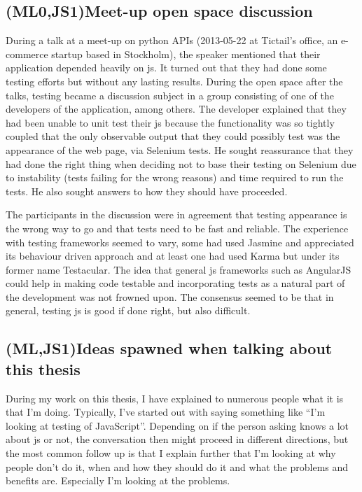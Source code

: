\documentclass[11pt]{article}
\begin{document}
\subsection{(ML0,JS1)Meet-up open space discussion}
\label{subsec:openspace}

During a talk at a meet-up on python APIs (2013-05-22 at Tictail's office, an e-commerce startup based in Stockholm), the speaker mentioned that their application depended heavily on \gls{js}. It turned out that they had done some testing efforts but without any lasting results. During the open space after the talks, testing became a discussion subject in a group consisting of one of the developers of the application, among others. The developer explained that they had been unable to unit test their \gls{js} because the functionality was so tightly coupled that the only observable output that they could possibly test was the appearance of the web page, via Selenium tests. He sought reassurance that they had done the right thing when deciding not to base their testing on Selenium due to instability (tests failing for the wrong reasons) and time required to run the tests. He also sought answers to how they should have proceeded.

The participants in the discussion were in agreement that testing appearance is the wrong way to go and that tests need to be fast and reliable. The experience with testing frameworks seemed to vary, some had used Jasmine and appreciated its behaviour driven approach and at least one had used Karma but under its former name Testacular. The idea that general \gls{js} frameworks such as AngularJS could help in making code testable and incorporating tests as a natural part of the development was not frowned upon. The consensus seemed to be that in general, testing \gls{js} is good if done right, but also difficult.

\subsection{(ML,JS1)Ideas spawned when talking about this thesis}

During my work on this thesis, I have explained to numerous people what it is that I'm doing. Typically, I've started out with saying something like ``I'm looking at testing of JavaScript''. Depending on if the person asking knows a lot about \gls{js} or not, the conversation then might proceed in different directions, but the most common follow up is that I explain further that I'm looking at why people don't do it, when and how they should do it and what the problems and benefits are. Especially I'm looking at the problems.
\end{document}
